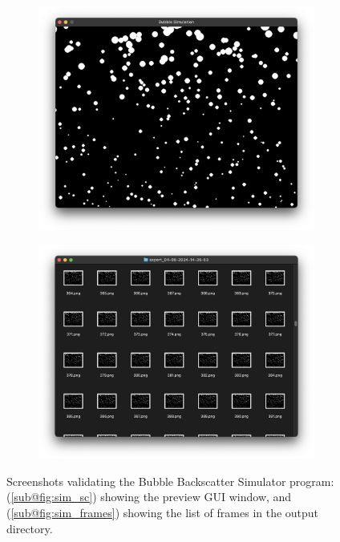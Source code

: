 \begin{figure}[H]
    \centering
    \begin{subfigure}{.49\textwidth}
        \centering
        \includegraphics[width=1\linewidth]{assets/test-sim-sc.png}
        \caption{}
        \label{fig:sim_sc}
    \end{subfigure}
    \hfill
    \begin{subfigure}{.49\textwidth}
        \centering
        \includegraphics[width=1\linewidth]{assets/test-sim-frames.png}
        \caption{}
        \label{fig:sim_frames}
    \end{subfigure}
    \caption{Screenshots validating the Bubble Backscatter Simulator program: (\ref{sub@fig:sim_sc}) showing the preview GUI window, and (\ref{sub@fig:sim_frames}) showing the list of frames in the output directory.}
    \label{fig:sim_validate}
\end{figure}

